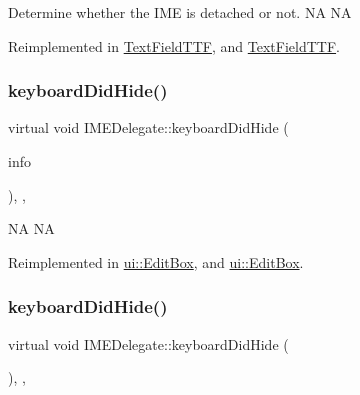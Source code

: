 Determine whether the I\+ME is detached or not.  NA  NA 

Reimplemented in \hyperlink{classTextFieldTTF_a90dd42e2fff33f7f466457a355fac292}{Text\+Field\+T\+TF}, and \hyperlink{classTextFieldTTF_a9d003ddd53582cd13e043feb23788f6a}{Text\+Field\+T\+TF}.

\mbox{\label{classIMEDelegate_a801b9cec4447e0f6418eae247afb7c72}} 
\subsubsection{\texorpdfstring{keyboard\+Did\+Hide()}{keyboardDidHide()}\hspace{0.1cm}{\footnotesize\ttfamily [1/2]}}
{\footnotesize\ttfamily virtual void I\+M\+E\+Delegate\+::keyboard\+Did\+Hide (\begin{DoxyParamCaption}\item[{\hyperlink{structIMEKeyboardNotificationInfo}{I\+M\+E\+Keyboard\+Notification\+Info} \&}]{info }\end{DoxyParamCaption})\hspace{0.3cm}{\ttfamily [inline]}, {\ttfamily [protected]}, {\ttfamily [virtual]}}

NA  NA 

Reimplemented in \hyperlink{classui_1_1EditBox_a3898b6685b2693973a59d68c328952a0}{ui\+::\+Edit\+Box}, and \hyperlink{classui_1_1EditBox_a54e44ca3b05a55e0498f6471a33a0c74}{ui\+::\+Edit\+Box}.

\mbox{\label{classIMEDelegate_a8d30a7809e4d55cd9e6b4b377c21b5fe}} 
\subsubsection{\texorpdfstring{keyboard\+Did\+Hide()}{keyboardDidHide()}\hspace{0.1cm}{\footnotesize\ttfamily [2/2]}}
{\footnotesize\ttfamily virtual void I\+M\+E\+Delegate\+::keyboard\+Did\+Hide (\begin{DoxyParamCaption}\item[{\hyperlink{structIMEKeyboardNotificationInfo}{I\+M\+E\+Keyboard\+Notification\+Info} \&}]{ }\end{DoxyParamCaption})\hspace{0.3cm}{\ttfamily [inline]}, {\ttfamily [protected]}, {\ttfamily [virtual]}}

